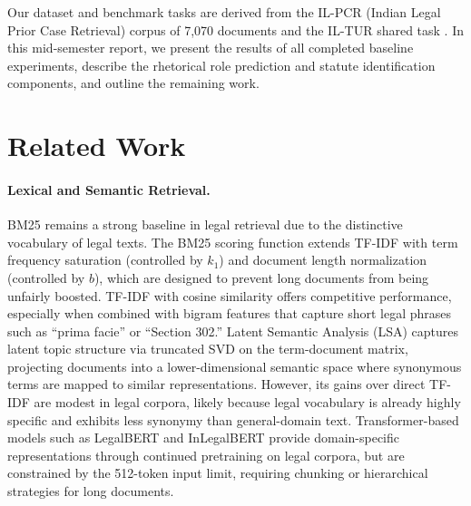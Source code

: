 \documentclass[11pt]{article}
\begin{document}
Our dataset and benchmark tasks are derived from the IL-PCR (Indian Legal Prior Case Retrieval) corpus of 7,070 documents \cite{joshi2023ucreat} and the IL-TUR shared task \cite{iltur2024}.
In this mid-semester report, we present the results of all completed baseline experiments, describe the rhetorical role prediction and statute identification components, and outline the remaining work.

\section{Related Work}

\paragraph{Lexical and Semantic Retrieval.}
BM25 \cite{robertson2009bm25} remains a strong baseline in legal retrieval due to the distinctive vocabulary of legal texts.
The BM25 scoring function extends TF-IDF with term frequency saturation (controlled by $k_1$) and document length normalization (controlled by $b$), which are designed to prevent long documents from being unfairly boosted.
TF-IDF with cosine similarity offers competitive performance, especially when combined with bigram features that capture short legal phrases such as ``prima facie'' or ``Section 302.''
Latent Semantic Analysis (LSA) captures latent topic structure via truncated SVD on the term-document matrix, projecting documents into a lower-dimensional semantic space where synonymous terms are mapped to similar representations.
However, its gains over direct TF-IDF are modest in legal corpora, likely because legal vocabulary is already highly specific and exhibits less synonymy than general-domain text.
Transformer-based models such as LegalBERT and InLegalBERT provide domain-specific representations through continued pretraining on legal corpora, but are constrained by the 512-token input limit, requiring chunking or hierarchical strategies for long documents.
\end{document}
